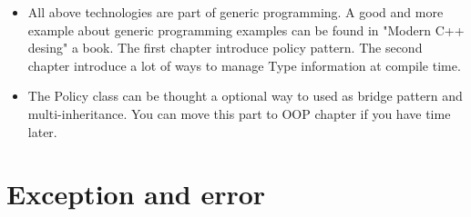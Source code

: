 \documentclass[a4paper,12pt,twoside]{book}
\begin{document}
\begin{itemize}
\begin{lstlisting}[frame=single, language=c++]
\end{lstlisting}

\item All above technologies are part of generic programming. A good and more example about generic programming examples can be found in "Modern C++ desing" a book. The first chapter introduce policy pattern. The second chapter introduce a lot of ways to manage Type information at compile time. 

\item The Policy class can be thought a optional way to used as bridge pattern and multi-inheritance. You can move this part to OOP chapter if you have time later.

\end{itemize}

\section{Exception and error}
\end{document}
